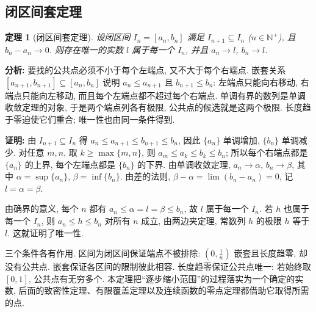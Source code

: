 \documentclass[UTF8,openany]{ctexbook}
\theoremstyle{chinesetextbook}
\newtheorem{theorem}{定理}[section]
\newenvironment{cnproof}{\par\indent\textbf{证明:} \ignorespaces}{\par}
\begin{document}
\subsection{闭区间套定理}
\begin{theorem}[闭区间套定理]
设闭区间 $I_n=[a_n,b_n]$ 满足 $I_{n+1}\subseteq I_n$ ($n\in\mathbb N^+$), 且 $b_n-a_n\to0$. 则存在唯一的实数 $l$ 属于每一个 $I_n$, 并且 $a_n\to l$, $b_n\to l$.
\end{theorem}
\par\indent\textbf{分析:} 要找的公共点必须不小于每个左端点, 又不大于每个右端点. 嵌套关系 $[a_{n+1},b_{n+1}]\subseteq[a_n,b_n]$ 说明 $a_n\le a_{n+1}$ 且 $b_{n+1}\le b_n$: 左端点只能向右移动, 右端点只能向左移动, 而且每个左端点都不超过每个右端点. 单调有界的数列是单调收敛定理的对象, 于是两个端点列各有极限, 公共点的候选就是这两个极限. 长度趋于零迫使它们重合; 唯一性也由同一条件得到.
\begin{cnproof}
由 $I_{n+1}\subseteq I_n$ 得 $a_n\le a_{n+1}\le b_{n+1}\le b_n$, 因此 $\{a_n\}$ 单调增加, $\{b_n\}$ 单调减少. 对任意 $m,n$, 取 $k\ge\max\{m,n\}$, 则 $a_m\le a_k\le b_k\le b_n$; 所以每个右端点都是 $\{a_n\}$ 的上界, 每个左端点都是 $\{b_n\}$ 的下界. 由单调收敛定理, $a_n\to\alpha$, $b_n\to\beta$, 其中 $\alpha=\sup\{a_n\}$, $\beta=\inf\{b_n\}$. 由差的法则, $\beta-\alpha=\lim(b_n-a_n)=0$, 记 $l=\alpha=\beta$.

由确界的意义, 每个 $n$ 都有 $a_n\le\alpha=l=\beta\le b_n$, 故 $l$ 属于每一个 $I_n$. 若 $h$ 也属于每一个 $I_n$, 则 $a_n\le h\le b_n$ 对所有 $n$ 成立, 由两边夹定理, 常数列 $h$ 的极限 $h$ 等于 $l$. 这就证明了唯一性.
\end{cnproof}
三个条件各有作用. 区间为闭区间保证端点不被排除: $\displaystyle\left(0,\frac1n\right)$ 嵌套且长度趋零, 却没有公共点. 嵌套保证各区间的限制彼此相容. 长度趋零保证公共点唯一: 若始终取 $[0,1]$, 公共点有无穷多个. 本定理把“逐步缩小范围”的过程落实为一个确定的实数, 后面的致密性定理、有限覆盖定理以及连续函数的零点定理都借助它取得所需的点.
\end{document}
